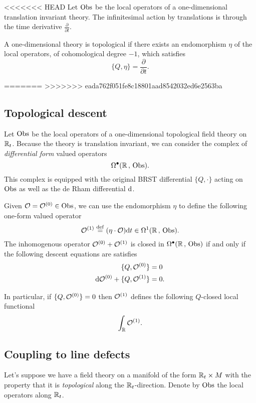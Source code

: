 \documentclass[11pt]{amsart}
\def\define{\overset{\rm def}{=}}
\begin{document}
<<<<<<< HEAD
Let ${\rm Obs}$ be the local operators of a one-dimensional translation invariant theory. 
The infinitesimal action by translations is through the time derivative $\frac{\partial}{\partial t}$. 

A one-dimensional theory is topological if there exists an endomorphism $\eta$ of the local operators, of cohomological degree $-1$, which satisfies
\[
\{Q, \eta\} = \frac{\partial}{\partial t} .
\]

=======
>>>>>>> eada762f051fe8c18801aad8542032ed6e2563ba

\subsection{Topological descent} 

Let ${\rm Obs}$ be the local operators of a one-dimensional topological field theory on $\mathbb R_t$. 
Because the theory is translation invariant, we can consider the complex of {\em differential form} valued operators
\[
\Omega^\bullet(\mathbb R \, , \, {\rm Obs}) .
\]
This complex is equipped with the original BRST differential $\{Q, \cdot\}$ acting on ${\rm Obs}$ as well as the de Rham differential ${\rm d}$. 

Given $\mathcal O = \mathcal O^{(0)} \in {\rm Obs}$, we can use the endomorphism $\eta$ to define the following one-form valued operator
\[
\cO^{(1)} \define (\eta \cdot \cO) \d t \in \Omega^1(\RR \, , \, \Obs).
\]
The inhomogenous operator $\mathcal O^{(0)} + \mathcal O^{(1)}$ is closed in $\Omega^\bullet(\mathbb R \, , \, {\rm Obs})$ if and only if the following descent equations are satisfies
\begin{align*}
\{Q, \mathcal O^{(0)}\} & = 0 \\
{\rm d} \mathcal O^{(0)} + \{Q, \mathcal O^{(1)}\} & = 0 .
\end{align*}

In particular, if $\{Q,\mathcal O^{(0)}\} = 0$ then $\mathcal O^{(1)}$ defines the following $Q$-closed local functional
\[
\int_\mathbb R \mathcal O^{(1)} .
\]

\subsection{Coupling to line defects} 

Let's suppose we have a field theory on a manifold of the form $\mathbb R_t \times M$ with the property that it is {\em topological} along the $\mathbb R_t$-direction. 
Denote by ${\rm Obs}$ the local operators along $\mathbb R_t$. 
\end{document}
